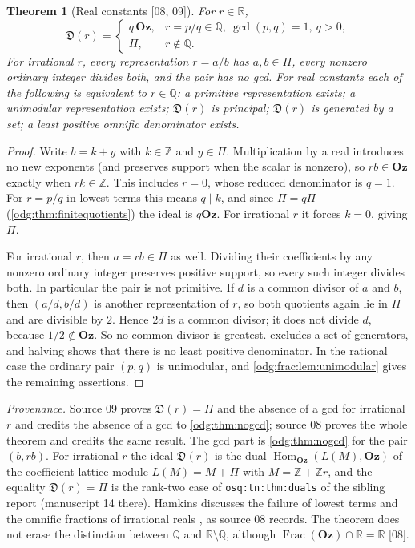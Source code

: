 \documentclass[11pt,oneside]{article}
\numberwithin{equation}{section}
\newtheorem{theorem}{Theorem}[section]
\theoremstyle{definition}
\theoremstyle{remark}
\newcommand{\Oz}{\mathbf{Oz}}
\newcommand{\Z}{\mathbb Z}
\newcommand{\Q}{\mathbb Q}
\newcommand{\R}{\mathbb R}
\newcommand{\Frac}{\operatorname{Frac}}
\newcommand{\src}[1]{\textup{\textsf{\small[#1]}}}
\newcommand{\status}[1]{\par\smallskip\noindent\textit{Provenance.} #1\par\smallskip}
\newcommand{\replabel}[1]{\nolinkurl{#1}}
\newcommand{\Den}{\mathfrak D}
\begin{document}
\begin{theorem}[Real constants \src{08, 09}]\label{odg:frac:thm:realconstants}
For $r\in\R$,
\[
 \Den(r)=
 \begin{cases}
 q\,\Oz,& r=p/q\in\Q,\ \gcd(p,q)=1,\ q>0,\\
 \Pi,& r\notin\Q.
 \end{cases}
\]
For irrational $r$, every representation $r=a/b$ has $a,b\in\Pi$, every
nonzero ordinary integer divides both, and the pair has no gcd. For real
constants each of the following is equivalent to $r\in\Q$: a primitive
representation exists; a unimodular representation exists; $\Den(r)$ is
principal; $\Den(r)$ is generated by a set; a least positive omnific
denominator exists.
\end{theorem}
\begin{proof}
Write $b=k+y$ with $k\in\Z$ and $y\in\Pi$. Multiplication by a real introduces
no new exponents (and preserves support when the scalar is nonzero), so
$rb\in\Oz$ exactly when $rk\in\Z$. This includes $r=0$, whose reduced
denominator is $q=1$. For $r=p/q$ in lowest terms this
means $q\mid k$, and since $\Pi=q\Pi$ (\cref{odg:thm:finitequotients}) the ideal
is $q\Oz$. For irrational $r$ it forces $k=0$, giving $\Pi$.

For irrational $r$, then $a=rb\in\Pi$ as well. Dividing their coefficients
by any nonzero ordinary integer preserves positive support, so every such
integer divides both. In particular the pair is not primitive.
If $d$ is a common divisor of
$a$ and $b$, then $(a/d,b/d)$ is another representation of $r$, so both
quotients again lie in $\Pi$ and are divisible by $2$. Hence $2d$ is a common
divisor; it does not divide $d$, because $1/2\notin\Oz$. So no common divisor
is greatest.  excludes a set of generators, and halving
shows that there is no least positive denominator. In the rational case the
ordinary pair $(p,q)$ is unimodular, and \cref{odg:frac:lem:unimodular} gives
the remaining assertions.
\end{proof}

\status{Source 09 proves $\Den(r)=\Pi$ and the absence of a gcd for irrational
$r$ and credits the absence of a gcd to \cref{odg:thm:nogcd}; source 08
proves the whole theorem and credits the same result. The gcd part is
\cref{odg:thm:nogcd} for the pair $(b,rb)$. For irrational $r$ the ideal
$\Den(r)$ is the dual $\operatorname{Hom}_{\Oz}(L(M),\Oz)$ of the coefficient-lattice module
$L(M)=M+\Pi$ with $M=\Z+\Z r$, and the equality $\Den(r)=\Pi$ is the rank-two
case of \replabel{osq:tn:thm:duals} of the sibling report (manuscript 14
there). Hamkins discusses the failure of lowest terms and the omnific
fractions of irrational reals \cite{Hamkins}, as source 08 records. The
theorem does not erase the distinction between $\Q$ and $\R\setminus\Q$,
although $\Frac(\Oz)\cap\R=\R$ \src{08}.}
\end{document}
